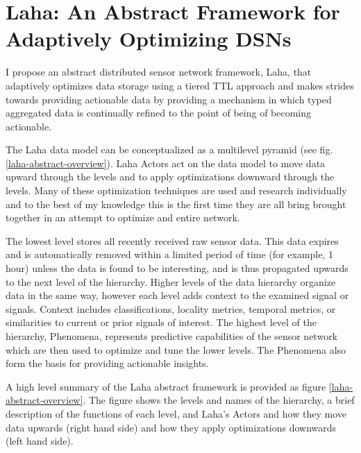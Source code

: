 \section{Laha: An Abstract Framework for Adaptively Optimizing DSNs}
I propose an abstract distributed sensor network framework, Laha, that adaptively optimizes data storage using a tiered TTL approach and makes strides towards providing actionable data by providing a mechanism in which typed aggregated data is continually refined to the point of being of becoming actionable. %

The Laha data model can be conceptualized as a multilevel pyramid (see fig. \ref{laha-abstract-overview}). Laha Actors act on the data model to move data upward through the levels and to apply optimizations downward through the levels. Many of these optimization techniques are used and research individually and to the best of my knowledge this is the first time they are all bring brought together in an attempt to optimize and entire network.

The lowest level stores all recently received raw sensor data. This data expires and is automatically removed within a limited period of time (for example, 1 hour) unless the data is found to be interesting, and is thus propagated upwards to the next level of the hierarchy.  Higher levels of the data hierarchy organize data in the same way, however each level adds context to the examined signal or signals. Context includes classifications, locality metrics, temporal metrics, or similarities to current or prior signals of interest. The highest level of the hierarchy, Phenomena, represents predictive capabilities of the sensor network which are then used to optimize and tune the lower levels. The Phenomena also form the basis for providing actionable insights. 

A high level summary of the Laha abstract framework is provided as figure \ref{laha-abstract-overview}. The figure shows the levels and names of the hierarchy, a brief description of the functions of each level, and Laha's Actors and how they move data upwards (right hand side) and how they apply optimizations downwards (left hand side).

